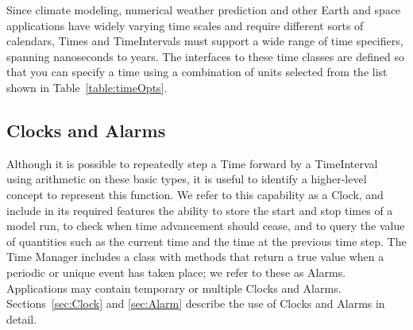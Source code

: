 Since climate modeling, numerical weather prediction and other 
Earth and space applications have widely varying time scales and require 
different sorts of calendars, Times and TimeIntervals must support 
a wide range of time specifiers, spanning nanoseconds to years.  The
interfaces to these time classes are defined so that you can specify a time
using a combination of units selected from the list shown in 
Table~\ref{table:timeOpts}.  

\subsection{Clocks and Alarms}
Although it is possible to repeatedly step a Time forward by a 
TimeInterval using arithmetic on these basic types, it is useful to 
identify a higher-level concept to represent this function.  We refer to 
this capability as a Clock, and include in its required features the 
ability to store the start and stop times of 
a model run, to check when time advancement should cease, 
and to query the value of quantities such as the current time and the
time at the previous time step.  The Time Manager includes a class 
with methods that return a true value when a periodic or unique event 
has taken place; we refer to these as Alarms.  Applications may contain 
temporary or multiple Clocks and Alarms.  Sections~\ref{sec:Clock} and
\ref{sec:Alarm} describe the use of Clocks and Alarms in detail.







